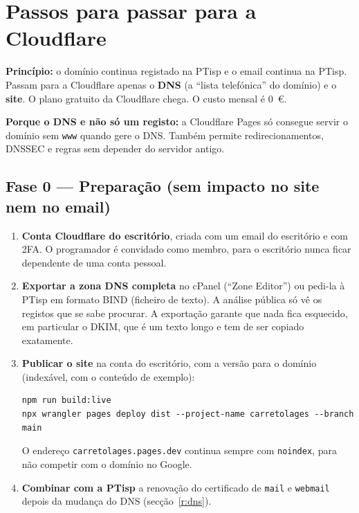 \documentclass[11pt,a4paper]{article}
\begin{document}
\section{Passos para passar para a Cloudflare}
\label{sec:migracao}

\textbf{Princípio:} o domínio continua registado na PTisp e o email continua na PTisp. Passam para a
Cloudflare apenas o \textbf{DNS} (a ``lista telefónica'' do domínio) e o \textbf{site}. O plano gratuito da
Cloudflare chega. O custo mensal é 0~€.

\textbf{Porque o DNS e não só um registo:} a Cloudflare Pages só consegue servir o domínio sem \texttt{www}
quando gere o DNS. Também permite redirecionamentos, DNSSEC e regras sem depender do servidor antigo.

\subsection{Fase 0 --- Preparação (sem impacto no site nem no email)}
\begin{enumerate}
  \item \textbf{Conta Cloudflare do escritório}, criada com um email do escritório e com 2FA. O
        programador é convidado como membro, para o escritório nunca ficar dependente de uma conta pessoal.
  \item \textbf{Exportar a zona DNS completa} no cPanel (``Zone Editor'') ou pedi-la à PTisp em formato
        BIND (ficheiro de texto). A análise pública só vê os registos que se sabe procurar. A exportação
        garante que nada fica esquecido, em particular o DKIM, que é um texto longo e tem de ser copiado
        exatamente.
  \item \textbf{Publicar o site} na conta do escritório, com a versão para o domínio
        (indexável, com o conteúdo de exemplo):
\begin{verbatim}
npm run build:live
npx wrangler pages deploy dist --project-name carretolages --branch main
\end{verbatim}
        O endereço \texttt{carretolages.pages.dev} continua sempre com \texttt{noindex}, para não
        competir com o domínio no Google.
  \item \textbf{Combinar com a PTisp} a renovação do certificado de \texttt{mail} e \texttt{webmail}
        depois da mudança do DNS (secção~\ref{r:dns}).
\end{enumerate}
\end{document}
